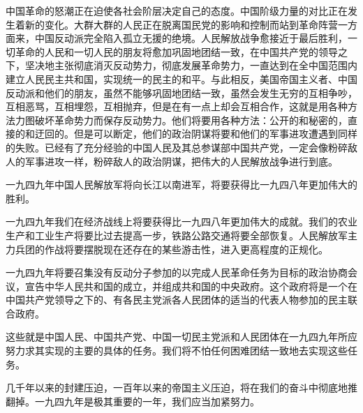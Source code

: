 中国革命的怒潮正在迫使各社会阶层决定自己的态度。中国阶级力量的对比正在发生着新的变化。大群大群的人民正在脱离国民党的影响和控制而站到革命阵营一方面来，中国反动派完全陷入孤立无援的绝境。人民解放战争愈接近于最后胜利，一切革命的人民和一切人民的朋友将愈加巩固地团结一致，在中国共产党的领导之下，坚决地主张彻底消灭反动势力，彻底发展革命势力，一直达到在全中国范围内建立人民民主共和国，实现统一的民主的和平。与此相反，美国帝国主义者、中国反动派和他们的朋友，虽然不能够巩固地团结一致，虽然会发生无穷的互相争吵，互相恶骂，互相埋怨，互相抛弃，但是在有一点上却会互相合作，这就是用各种方法力图破坏革命势力而保存反动势力。他们将要用各种方法：公开的和秘密的，直接的和迂回的。但是可以断定，他们的政治阴谋将要和他们的军事进攻遭遇到同样的失败。已经有了充分经验的中国人民及其总参谋部中国共产党，一定会像粉碎敌人的军事进攻一样，粉碎敌人的政治阴谋，把伟大的人民解放战争进行到底。

一九四九年中国人民解放军将向长江以南进军，将要获得比一九四八年更加伟大的胜利。

一九四九年我们在经济战线上将要获得比一九四八年更加伟大的成就。我们的农业生产和工业生产将要比过去提高一步，铁路公路交通将要全部恢复。人民解放军主力兵团的作战将要摆脱现在还存在的某些游击性，进入更高程度的正规化。

一九四九年将要召集没有反动分子参加的以完成人民革命任务为目标的政治协商会议，宣告中华人民共和国的成立，并组成共和国的中央政府。这个政府将是一个在中国共产党领导之下的、有各民主党派各人民团体的适当的代表人物参加的民主联合政府。

这些就是中国人民、中国共产党、中国一切民主党派和人民团体在一九四九年所应努力求其实现的主要的具体的任务。我们将不怕任何困难团结一致地去实现这些任务。

几千年以来的封建压迫，一百年以来的帝国主义压迫，将在我们的奋斗中彻底地推翻掉。一九四九年是极其重要的一年，我们应当加紧努力。


